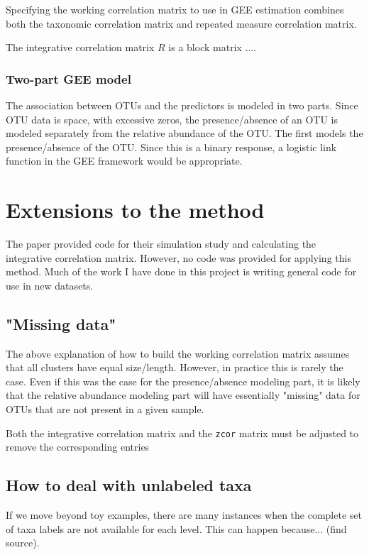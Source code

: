 \documentclass[12pt]{article}
\begin{document}
Specifying the working correlation matrix to use in GEE estimation combines both the taxonomic correlation matrix and repeated measure correlation matrix.

The integrative correlation matrix $R$ is a block matrix ....


\subsubsection{Two-part GEE model}

The association between OTUs and the predictors is modeled in two parts. Since OTU data is space, with excessive zeros, the presence/absence of an OTU is modeled separately from the relative abundance of the OTU.
The first models the presence/absence of the OTU. Since this is a binary response, a logistic link function in the GEE framework would be appropriate.



\section{Extensions to the method}

The paper provided code for their simulation study and calculating the integrative correlation matrix. However, no code was provided for applying this method. Much of the work I have done in this project is writing general code for use in new datasets.

\subsection{"Missing data"}
The above explanation of how to build the working correlation matrix assumes that all clusters have equal size/length. However, in practice this is rarely the case. Even if this was the case for the presence/absence modeling part, it is likely that the relative abundance modeling part will have essentially "missing" data for OTUs that are not present in a given sample.

Both the integrative correlation matrix and the \texttt{zcor} matrix must be adjusted to remove the corresponding entries


\subsection{How to deal with unlabeled taxa}

If we move beyond toy examples, there are many instances when the complete set of taxa labels are not available for each level. This can happen because... (find source).
\end{document}
